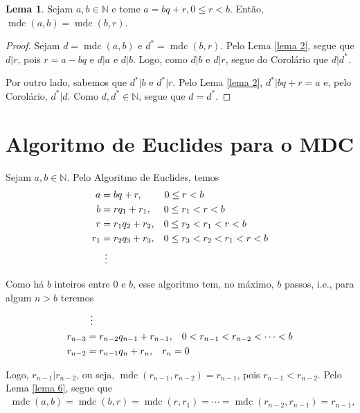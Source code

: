 \documentclass[a4paper,11pt,twoside, leqno]{article}
\DeclareMathOperator{\mdc}{mdc}
\theoremstyle{definition}
\newtheorem{lemma}[theorem]{Lema}
\begin{document}
\begin{lemma}
	\label{lema 6}
	Sejam $a,b\in\mathbb{N}$ e tome $a = bq+r, 0\leq r < b$. Então, $\mdc(a,b) = \mdc(b,r)$.
\end{lemma}
\begin{proof}
	Sejam $d = \mdc(a,b)$ e $d^\ast = \mdc(b,r)$. Pelo Lema \eqref{lema 2}, segue que $d|r$, pois $r = a - bq$ e $d|a$ e $d|b$. Logo, como $d|b$ e $d|r$, segue do Corolário que $d|d^\ast$.
	
	Por outro lado, sabemos que $d^\ast |b$ e $d^\ast |r$. Pelo Lema \eqref{lema 2}, $d^\ast |bq+r=a$ e, pelo Corolário, $d^\ast |d$. Como $d,d^\ast\in\mathbb{N}$, segue que $d = d^\ast$.
\end{proof}
\section{Algoritmo de Euclides para o MDC}
\hspace{12pt} Sejam $a,b\in\mathbb{N}$. Pelo Algoritmo de Euclides, temos
\begin{align*}
a &= bq + r, \hspace{0.8cm} 0\leq r < b \\
b &= rq_1 + r_1, \hspace{0.45cm} 0\leq r_1 < r < b \\
r &= r_1q_2 + r_2, \hspace{0.3cm} 0\leq r_2 < r_1 < r < b \\
r_1 &= r_2q_3 + r_3, \hspace{0.3cm} 0\leq r_3 < r_2 < r_1 < r < b \\
&\hspace{0.15cm}\vdots 
\end{align*}
\par Como há $b$ inteiros entre $0$ e $b$, esse algoritmo tem, no máximo, $b$ passos, i.e., para algum $n>b$ teremos
\begin{align*}
&\hspace{0.15cm}\vdots \\
r_{n-3} &= r_{n-2}q_{n-1} + r_{n-1}, \hspace{0.3cm} 0 < r_{n-1} < r_{n-2} < \cdots < b \\
r_{n-2} &= r_{n-1}q_n + r_n, \hspace{0.3cm} r_n = 0
\end{align*}
\par Logo, $r_{n-1}|r_{n-2}$, ou seja, $\mdc(r_{n-1}, r_{n-2}) = r_{n-1}$, pois $r_{n-1} < r_{n-2}$. Pelo Lema \eqref{lema 6}, segue que
\begin{align*}
\mdc(a,b) = \mdc(b,r) = \mdc(r,r_1) = \cdots = \mdc(r_{n-2}, r_{n-1}) = r_{n-1},
\end{align*}
\end{document}
